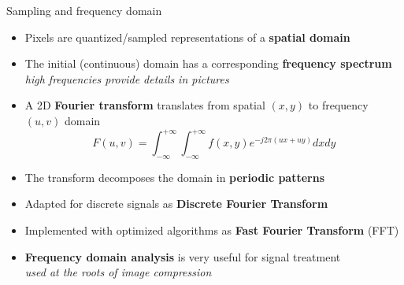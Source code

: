 \begin{frame}{Sampling and frequency domain}
  \begin{itemize}
  \item Pixels are quantized/sampled representations of a \textbf{spatial domain}
  \item The initial (continuous) domain has a corresponding \textbf{frequency spectrum}\\
    \textit{high frequencies provide details in pictures}
  \item A 2D \textbf{Fourier transform} translates from spatial \((x,y)\) to frequency \((u,v)\) domain
\[
F(u,v) = \int_{-\infty}^{+\infty} \int_{-\infty}^{+\infty} f(x,y)e^{-j2\pi(ux+uy)}dxdy
\]
  \item The transform decomposes the domain in \textbf{periodic patterns}
  \item Adapted for discrete signals as \textbf{Discrete Fourier Transform}
  \item Implemented with optimized algorithms as \textbf{Fast Fourier Transform} (FFT)
  \item \textbf{Frequency domain analysis} is very useful for signal treatment\\
    \textit{used at the roots of image compression}
  \end{itemize}
\end{frame}

